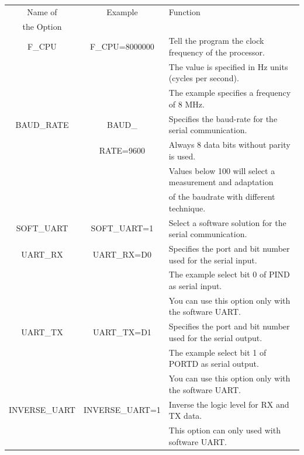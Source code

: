 \begin{table}[H]
  \begin{center}
    \begin{tabular}{| c | c | l |}
    \hline
   Name of        & Example         & Function                                            \\
   the Option         &                &                                                     \\
    \hline
    \hline
    F\_CPU         & F\_CPU=8000000 & Tell the program the clock frequency of the processor. \\
                   &                & The value is specified in Hz units (cycles per second). \\
                   &                & The example specifies a frequency of 8 MHz. \\
    \hline
    BAUD\_RATE     & BAUD\_         & Specifies the baud-rate for the serial communication. \\
                   &  RATE=9600     & Always 8 data bits without parity is used. \\
                   &                & Values below 100 will select a measurement and adaptation \\
                   &                & of the baudrate with different technique. \\
    \hline
    SOFT\_UART     & SOFT\_UART=1   & Select a software solution for the serial communication. \\
    \hline
    UART\_RX        & UART\_RX=D0   & Specifies the port and bit number used for the serial input. \\
                   &                & The example select bit 0 of PIND as serial input. \\
                   &                & You can use this option only with the software UART. \\
    \hline
    UART\_TX        & UART\_TX=D1   & Specifies the port and bit number used for the serial output. \\
                   &                & The example select bit 1 of PORTD as serial output. \\
                   &                & You can use this option only with the software UART. \\
    \hline
   INVERSE\_UART  & INVERSE\_UART=1 & Inverse the logic level for RX and TX data.\\
	           &                & This option can only used with software UART. \\

\end{tabular}
\end{center}
\end{table}
